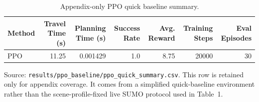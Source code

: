 
\begin{table}[t]
\centering
\caption{Appendix-only PPO quick baseline summary.}
\label{tab:tableA1_ppo_appendix}
\small
\begin{threeparttable}
\begin{tabular}{lrrrrrr}
\toprule
Method & Travel Time (s) & Planning Time (s) & Success Rate & Avg. Reward & Training Steps & Eval Episodes \\
\midrule
PPO & 11.25 & 0.001429 & 1.0 & 8.75 & 20000 & 30 \\
\bottomrule
\end{tabular}
\begin{tablenotes}[flushleft]
\footnotesize
\item Source: \texttt{results/ppo\_baseline/ppo\_quick\_summary.csv}. This row is retained only for appendix coverage. It comes from a simplified quick-baseline environment rather than the scene-profile-fixed live SUMO protocol used in Table~1.
\end{tablenotes}
\end{threeparttable}
\end{table}
